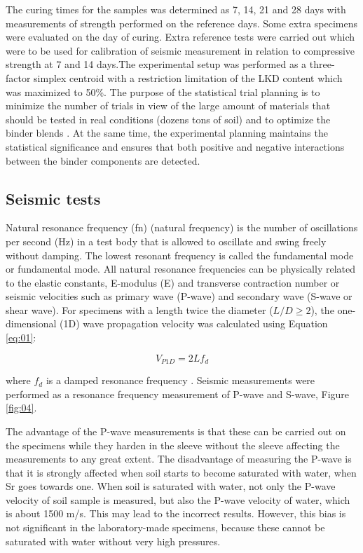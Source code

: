 \documentclass[final,3p,times,onecolumn,authoryear]{elsarticle}
\begin{document}
The curing times for the samples was determined as 7, 14, 21 and 28 days with measurements of strength performed on the reference days. Some extra specimens were evaluated on the  day of curing. Extra reference tests were carried out which were to be used for calibration of seismic measurement in relation to compressive strength at 7 and 14 days.The experimental setup was performed as a three-factor simplex centroid with a restriction limitation of the LKD content which was maximized to 50\%. The purpose of the statistical trial planning is to minimize the number of trials in view of the large amount of materials that should be tested in real conditions (dozens tons of soil) and to optimize the binder blends \citep{Lindh2001}. At the same time, the experimental planning maintains the statistical significance and ensures that both positive and negative interactions between the binder components are detected. 

\subsection{Seismic tests}

Natural resonance frequency (fn) (natural frequency) is the number of oscillations per second (Hz) in a test body that is allowed to oscillate and swing freely without damping. The lowest resonant frequency is called the fundamental mode or fundamental mode. All natural resonance frequencies can be physically related to the elastic constants, E-modulus (E) and transverse contraction number or seismic velocities such as primary wave (P-wave) and secondary wave (S-wave or shear wave). For specimens with a length twice the diameter ($L/D\geq2$), the one-dimensional (1D) wave propagation velocity was calculated using Equation \ref{eq:01}:

\begin{equation}\label{eq:01}
	V_{P1D} =2Lf_d
\end{equation}

where $f_d$ is a damped resonance frequency \citep{Rydenetal2006}.
Seismic measurements were performed as a resonance frequency measurement of P-wave and S-wave, Figure \ref{fig:04}.

The advantage of the P-wave measurements is that these can be carried out on the specimens while they harden in the sleeve without the sleeve affecting the measurements to any great extent. The disadvantage of measuring the P-wave is that it is strongly affected when soil starts to become saturated with water, when Sr goes towards one. When soil is saturated with water, not only the P-wave velocity of soil sample is measured, but also the P-wave velocity of water, which is about 1500 m/s. This may lead to the incorrect results. However, this bias is not significant in the laboratory-made specimens, because these cannot be saturated with water without very high pressures. 
\end{document}
